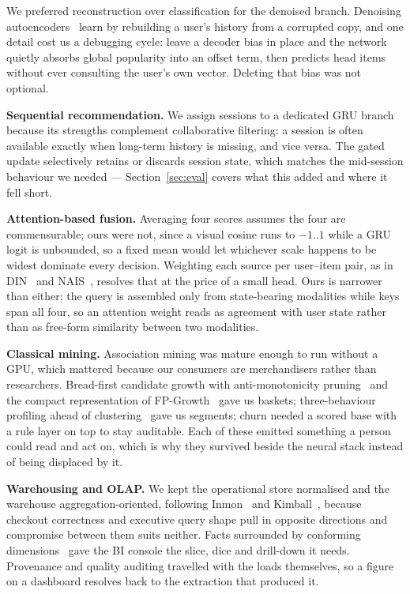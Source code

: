 \documentclass[conference]{IEEEtran}
\begin{document}
We preferred reconstruction over classification for the denoised branch.
Denoising autoencoders~\cite{ma2015autorec} learn by rebuilding a user's history
from a corrupted copy, and one detail cost us a debugging cycle: leave a decoder
bias in place and the network quietly absorbs global popularity into an offset
term, then predicts head items without ever consulting the user's own vector.
Deleting that bias was not optional.

\textbf{Sequential recommendation.} We assign sessions to a dedicated GRU branch
because its strengths complement collaborative filtering: a session is often
available exactly when long-term history is missing, and vice versa.
The gated update \cite{chung2015gru4rec} selectively retains or discards session
state, which matches the mid-session behaviour we needed --- Section~\ref{sec:eval}
covers what this added and where it fell short.

\textbf{Attention-based fusion.} Averaging four scores assumes the four are
commensurable; ours were not, since a visual cosine runs to $-1..1$ while a GRU
logit is unbounded, so a fixed mean would let whichever scale happens to be widest
dominate every decision. Weighting each source per user--item pair, as in
DIN~\cite{zhou2018din} and
NAIS~\cite{zhang2019nais}, resolves that at the price of a small head. Ours is
narrower than either: the query is assembled only from state-bearing modalities
while keys span all four, so an attention weight reads as agreement with user
state rather than as free-form similarity between two modalities.

\textbf{Classical mining.} Association mining was mature enough to run without a
GPU, which mattered because our consumers are merchandisers rather than
researchers. Bread-first candidate growth with anti-monotonicity
pruning~\cite{agrawal1994survey} and the compact representation of
FP-Growth~\cite{han2000fpgrowth} gave us baskets; three-behaviour profiling ahead of
clustering~\cite{fildes2002retail} gave us segments; churn
needed a scored base with a rule layer on top to stay auditable. Each of these
emitted something a person could read and act on, which is why they survived
beside the neural stack instead of being displaced by it.

\textbf{Warehousing and OLAP.} We kept the operational store normalised and the
warehouse aggregation-oriented, following Inmon~\cite{inmon2002building} and
Kimball~\cite{kimball2013toolkit}, because checkout correctness and executive
query shape pull in opposite directions and compromise between them suits neither.
Facts surrounded by conforming dimensions~\cite{chaudhuri1997olap,simon2005dw} gave the BI console
the slice, dice and drill-down it needs. Provenance and quality auditing
travelled with the loads
themselves, so a figure on a dashboard resolves back to
the extraction that produced it.
\end{document}

